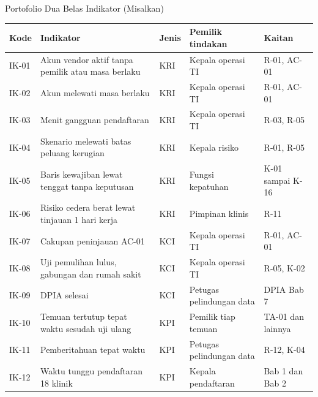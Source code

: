 \documentclass[aspectratio=169, table, 12pt]{beamer}
\begin{document}
\begin{frame}{{\Large Portofolio Dua Belas Indikator (Misalkan)}}
  \vspace{0pt}
  \fontsize{7}{8.5}\selectfont
  \renewcommand{\arraystretch}{1.02}
  \begin{tabularx}{\textwidth}{|>{\raggedright\arraybackslash}p{}|>{\raggedright\arraybackslash}X|>{\raggedright\arraybackslash}p{}|>{\raggedright\arraybackslash}p{}|>{\raggedright\arraybackslash}p{}|}
    \hline
    \textbf{Kode} & \textbf{Indikator} & \textbf{Jenis} & \textbf{Pemilik tindakan} &
    \textbf{Kaitan} \\ \hline
    IK-01 & Akun vendor aktif tanpa pemilik atau masa berlaku & KRI & Kepala operasi TI & R-01,
    AC-01 \\ \hline
    IK-02 & Akun melewati masa berlaku & KRI & Kepala operasi TI & R-01, AC-01 \\ \hline
    IK-03 & Menit gangguan pendaftaran & KRI & Kepala operasi TI & R-03, R-05 \\ \hline
    IK-04 & Skenario melewati batas peluang kerugian & KRI & Kepala risiko & R-01, R-05 \\ \hline
    IK-05 & Baris kewajiban lewat tenggat tanpa keputusan & KRI & Fungsi kepatuhan & K-01 sampai
    K-16 \\ \hline
    IK-06 & Risiko cedera berat lewat tinjauan 1 hari kerja & KRI & Pimpinan klinis & R-11 \\ \hline
    IK-07 & Cakupan peninjauan AC-01 & KCI & Kepala operasi TI & R-01, AC-01 \\ \hline
    IK-08 & Uji pemulihan lulus, gabungan dan rumah sakit & KCI & Kepala operasi TI & R-05, K-02 \\
    \hline
    IK-09 & DPIA selesai & KCI & Petugas pelindungan data & 5 DPIA Bab 7 \\ \hline
    IK-10 & Temuan tertutup tepat waktu sesudah uji ulang & KPI & Pemilik tiap temuan & TA-01 dan
    lainnya \\ \hline
    IK-11 & Pemberitahuan tepat waktu & KPI & Petugas pelindungan data & R-12, K-04 \\ \hline
    IK-12 & Waktu tunggu pendaftaran 18 klinik & KPI & Kepala pendaftaran & Bab 1 dan Bab 2 \\
    \hline
  \end{tabularx}
\end{frame}
\end{document}
